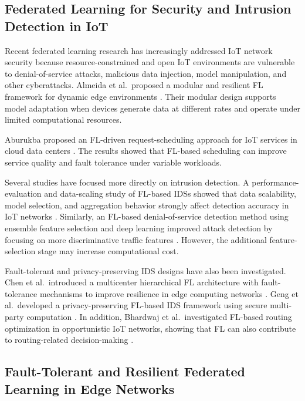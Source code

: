 \documentclass[5p,times,numafflabel]{elsarticle}
\begin{document}
	\subsection{Federated Learning for Security and Intrusion Detection
		in IoT}
	\label{subsec:fl-ids}
	
	Recent federated learning research has increasingly addressed IoT
	network security because resource-constrained and open IoT
	environments are vulnerable to denial-of-service attacks, malicious
	data injection, model manipulation, and other cyberattacks.
	Almeida et al.\ proposed a modular and resilient FL framework for
	dynamic edge environments \cite{almeida2025modular}. Their modular
	design supports model adaptation when devices generate data at
	different rates and operate under limited computational resources.
	
	Aburukba proposed an FL-driven request-scheduling approach for IoT
	services in cloud data centers \cite{aburukba2025scheduling}. The
	results showed that FL-based scheduling can improve service quality
	and fault tolerance under variable workloads.
	
	Several studies have focused more directly on intrusion detection.
	A performance-evaluation and data-scaling study of FL-based IDSs
	showed that data scalability, model selection, and aggregation
	behavior strongly affect detection accuracy in IoT networks
	\cite{albanbay2025ids}. Similarly, an FL-based denial-of-service
	detection method using ensemble feature selection and deep learning
	improved attack detection by focusing on more discriminative traffic
	features \cite{alghadi2025dos}. However, the additional
	feature-selection stage may increase computational cost.
	
	Fault-tolerant and privacy-preserving IDS designs have also been
	investigated. Chen et al.\ introduced a multicenter hierarchical FL
	architecture with fault-tolerance mechanisms to improve resilience
	in edge computing networks \cite{chen2025hierarchical}. Geng et al.\
	developed a privacy-preserving FL-based IDS framework using secure
	multi-party computation \cite{geng2024smpc}. In addition, Bhardwaj
	et al.\ investigated FL-based routing optimization in opportunistic
	IoT networks, showing that FL can also contribute to routing-related
	decision-making \cite{bhardwaj2024routing}.
	
	\subsection{Fault-Tolerant and Resilient Federated Learning
		in Edge Networks}
	\label{subsec:fault-tolerant-fl}
	
\end{document}
